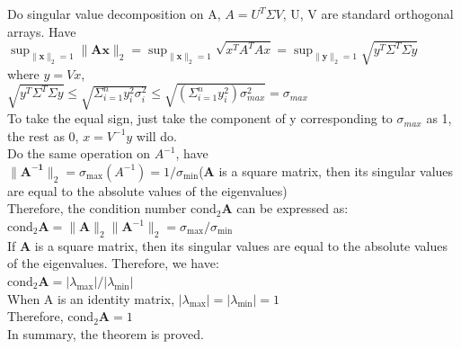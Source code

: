 \documentclass[a4paper]{article}
\begin{document}
Do singular value decomposition on A, $A=U^T\Sigma V$, U, V are standard orthogonal arrays. Have $\sup_{\|\mathbf{x}\|_2 = 1} \|\mathbf{A}\mathbf{x}\|_2=\sup_{\|\mathbf{x}\|_2 = 1} \sqrt{x^TA^TAx}=\sup_{\|\mathbf{y}\|_2 = 1}\sqrt{y^T\Sigma^T\Sigma y}$\\
where $y=Vx$,\\
$\sqrt{y^T\Sigma^T\Sigma y} \leq \sqrt{\Sigma_{i=1}^n y_i^2\sigma_{i}^2} \leq \sqrt{(\Sigma_{i=1}^n y_i^2)\sigma_{max}^2}=\sigma_{max}$\\
To take the equal sign, just take the component of y corresponding to $\sigma_{max}$ as 1, the rest as 0, $x=V^{-1}y$ will do.\\
Do the same operation on $A^{-1}$, have\\
   $\|\mathbf{A^{-1}}\|_2 = \sigma_{\max}(A^{-1})=1/\sigma_{\min}$($\mathbf{A}$ is a square matrix, then its singular values are equal to the absolute values of the eigenvalues)\\

Therefore, the condition number $\text{cond}_2 \mathbf{A}$ can be expressed as:\\
   $\text{cond}_2 \mathbf{A} = \|\mathbf{A}\|_2 \|\mathbf{A}^{-1}\|_2 = \sigma_{\max}/\sigma_{\min}$\\

If $\mathbf{A}$ is a square matrix, then its singular values are equal to the absolute values of the eigenvalues. Therefore, we have:\\
   $\text{cond}_2 \mathbf{A} = |\lambda_{\max}|/|\lambda_{\min}|$\\

When A is an identity matrix, $|\lambda_{\max}|=|\lambda_{\min}|=1$\\
Therefore, $\text{cond}_2 \mathbf{A}=1$\\

In summary, the theorem is proved.\\
\end{document}
